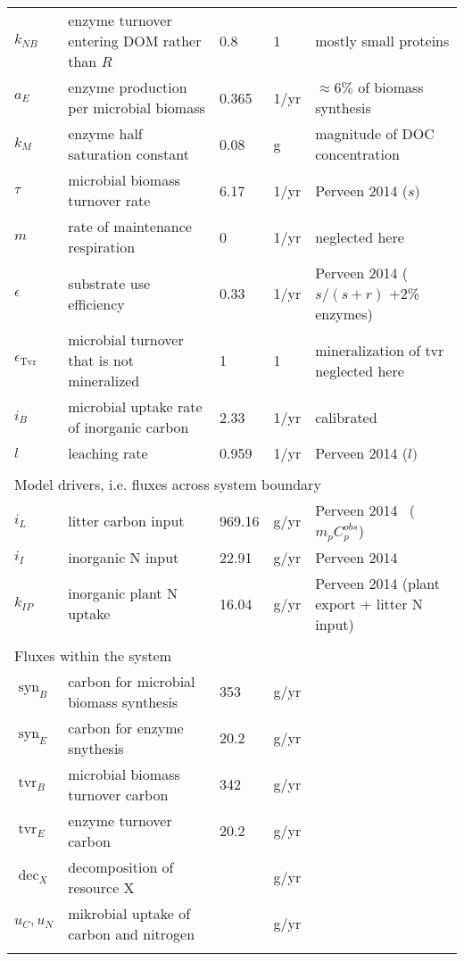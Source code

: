 \begin{table}[t]
\begin{tabular}{lllll}
$k_{NB}$ & enzyme turnover entering DOM rather than $R$ & 
0.8 & 1 & mostly small proteins \\
$a_{E}$ &  enzyme production per microbial biomass & 0.365 &
1/yr & $\approx 6\%$ of biomass synthesis \\ 
$k_{M}$ &  enzyme half saturation constant & 0.08 & g & magnitude of DOC
concentration \\
$\tau$ &  microbial biomass turnover rate & 6.17 & 1/yr & Perveen 2014
($s$) \\
$m$ & rate of maintenance respiration & 0 &
1/yr & neglected here \\
$\epsilon$ & substrate use efficiency & 0.33 &
1/yr & Perveen 2014 ($s/(s+r)$ +2\% enzymes) \\
$\epsilon_{\operatorname{Tvr}}$ & microbial turnover that is not
mineralized & 1 & 1 & mineralization of tvr neglected here  \\
$i_{B}$ & microbial uptake rate of inorganic carbon & 2.33 & 1/yr 
& calibrated \\
$l$ & leaching rate & 0.959 &
1/yr & Perveen 2014 ($l)$ \\
\\
\multicolumn{5}{l}{Model drivers, i.e. fluxes across system boundary}  \\ 
$i_{L}$ & litter carbon input & 969.16 & g/yr 
& Perveen 2014 \, ($m_p C^{obs}_p$)\\
$i_{I}$ & inorganic N input & 22.91 & g/yr 
& Perveen 2014 \\
$k_{IP}$ & inorganic plant N uptake & 16.04 &  g/yr 
& Perveen 2014 (plant export + litter N input)\\
\\
\multicolumn{5}{l}{Fluxes within the system} \\
$\operatorname{syn}_B $ & carbon for microbial biomass synthesis & 353 & g/yr &
\\
$\operatorname{syn}_E $ & carbon for enzyme snythesis & 20.2 & g/yr & \\
$\operatorname{tvr}_B $ & microbial biomass turnover carbon & 342 & g/yr & \\
$\operatorname{tvr}_E $ & enzyme turnover carbon &  20.2 & g/yr & \\
$\operatorname{dec}_X $ & decomposition of resource X & & g/yr & \\
$u_C,u_N$ & mikrobial uptake of carbon and nitrogen  & & g/yr & \\

\bottomhline
\end{tabular}
\end{table}


